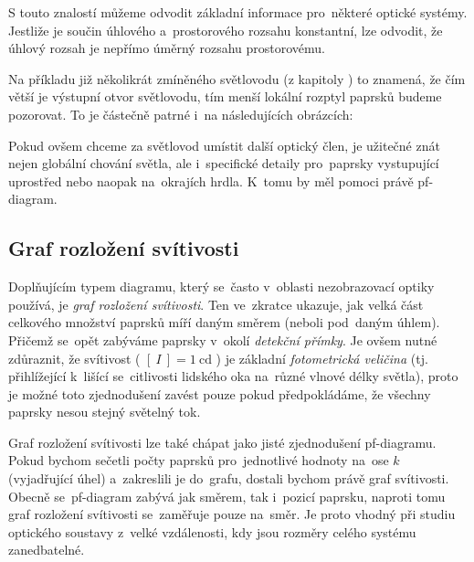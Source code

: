 S touto znalostí můžeme odvodit základní informace pro~některé optické systémy. Jest\-li\-že je součin úhlového a~prostorového rozsahu konstantní, lze odvodit, že úhlový rozsah je nepřímo úměrný rozsahu prostorovému. 


Na příkladu již několikrát zmíněného světlovodu (z kapitoly ) to znamená, že čím větší je výstupní otvor světlovodu, tím menší lokální rozptyl paprsků budeme pozorovat. To je částečně patrné i~na následujících obrázcích:


Pokud ovšem chceme za světlovod umístit další optický člen, je užitečné znát nejen globální chování světla, ale i~specifické detaily pro~paprsky vystupující uprostřed nebo naopak na~okrajích hrdla. K~tomu by měl pomoci právě pf-diagram.


\subsection{Graf rozložení svítivosti}

Doplňujícím typem diagramu, který se~často v~oblasti nezobrazovací optiky používá, je \emph{graf rozložení svítivosti}. Ten ve~zkratce ukazuje, jak velká část celkového množství paprsků míří daným směrem (neboli pod~daným úhlem). Přičemž se~opět zabýváme paprsky v~okolí \emph{detekční přímky}. Je ovšem nutné zdůraznit, že svítivost ( $[\ I\ ] = 1\ \mathrm{cd}$ ) je základní \emph{fotometrická veličina} \parencite{fotometrie} (tj. přihlížející k~lišící se~citlivosti lidského oka na~různé vlnové délky světla), proto je možné toto zjednodušení zavést pouze pokud předpokládáme, že všechny paprsky nesou stejný světelný tok.

Graf rozložení svítivosti lze také chápat jako jisté zjednodušení pf-diagramu. Pokud bychom sečetli počty paprsků pro~jednotlivé hodnoty na~ose $k$ (vyjadřující úhel) a~zakreslili je do~grafu, dostali bychom právě graf svítivosti. Obecně se~pf-diagram zabývá jak směrem, tak i~pozicí paprsku, naproti tomu graf rozložení svítivosti se~zaměřuje pouze na~směr. Je proto vhodný při studiu optického soustavy z~velké vzdálenosti, kdy jsou rozměry celého systému zanedbatelné.

